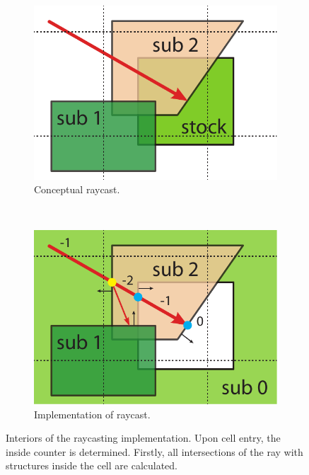 \begin{figure}
	\centering
	\begin{subfigure}[t]{0.44\textwidth}
		\centering
		\includegraphics[width=\textwidth]{images/raycast_grid}
		\caption{Conceptual raycast.}
		\label{fig:raycast_grid}
	\end{subfigure}
	~
	\begin{subfigure}[t]{0.44\textwidth}
		\centering
		\includegraphics[width=\textwidth]{images/raycast_inside_counter}
		\caption{Implementation of raycast.}
		\label{fig:raycast_inside_counter}
	\end{subfigure}
	\caption[Raycasting interiors]{
		Interiors of the raycasting implementation.
		Upon cell entry, the inside counter is determined.
		Firstly, all intersections of the ray with structures inside the cell are calculated.
}
\end{figure}
